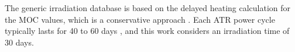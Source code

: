 The generic irradiation database is based on the delayed heating calculation for the \gls*{MOC} values, which is a conservative approach \cite{ilas_impact_2013}.
Each ATR power cycle typically lasts for 40 to 60 days \cite{sterbentz_agr1_2018}, and this work considers an irradiation time of 30 days.




